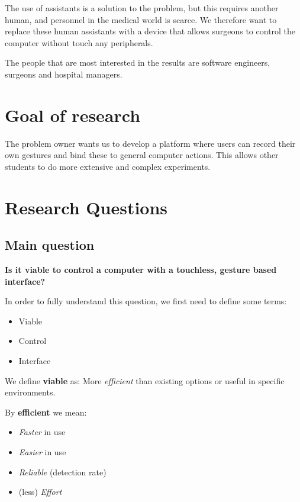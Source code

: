 \documentclass[a4paper]{article}
\providecommand{\tightlist}{%
\setlength{\itemsep}{0pt}\setlength{\parskip}{0pt}}
\begin{document}
  The use of assistants is a solution to the problem, but this requires another
  human, and personnel in the medical world is scarce. We therefore want to
  replace these human assistants with a device that allows surgeons to control
  the computer without touch any peripherals.

  The people that are most interested in the results are software engineers,
  surgeons and hospital managers.
  \clearpage

  \section{Goal of research}
  The problem owner wants us to develop a platform where users can record their
  own gestures and bind these to general computer actions. This allows other
  students to do more extensive and complex experiments.
  \clearpage

  \section{Research Questions}
  \subsection{Main question}
  \textbf{Is it viable to control a computer with a touchless, gesture based
    interface?}

  In order to fully understand this question, we first need to define
  some terms:
  \begin{itemize}
    \tightlist
    \item Viable
    \item Control
    \item Interface
  \end{itemize}

  We define \textbf{viable} as: More \textit{efficient} than existing options or
  useful in specific environments.

  By \textbf{efficient} we mean:
  \begin{itemize}
    \tightlist
    \item \textit{Faster} in use
    \item \textit{Easier} in use
    \item \textit{Reliable} (detection rate)
    \item (less) \textit{Effort}
  \end{itemize}

  \clearpage
\end{document}
